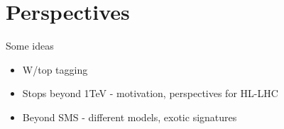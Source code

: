 
\section{Perspectives}

Some ideas

\begin{itemize}
\item W/top tagging
\item Stops beyond 1TeV  - motivation, perspectives for HL-LHC
\item Beyond SMS - different models, exotic signatures
\end{itemize}



	






